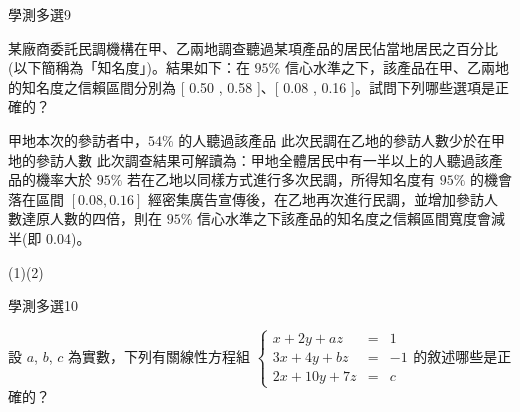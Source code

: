 \begin{QUESTIONS}
\begin{QUESTION}
\begin{ExamInfo}{98}{學測}{多選}{9}
        \end{ExamInfo}
        \begin{ExamAnsRateInfo}{7}{6}{8}{7}
        \end{ExamAnsRateInfo}
        \begin{QBODY}
            某廠商委託民調機構在甲、乙兩地調查聽過某項產品的居民佔當地居民之百分比(以下簡稱為「知名度」)。結果如下：在 $95\%$ 信心水準之下，該產品在甲、乙兩地的知名度之信賴區間分別為 [ 0.50 , 0.58 ]、[ 0.08 , 0.16 ]。試問下列哪些選項是正確的？ 
		\begin{QOPS} 
			\QOP 甲地本次的參訪者中，$54\%$ 的人聽過該產品 
			\QOP 此次民調在乙地的參訪人數少於在甲地的參訪人數 
			\QOP 此次調查結果可解讀為：甲地全體居民中有一半以上的人聽過該產品的機率大於 $95\%$    
			\QOP 若在乙地以同樣方式進行多次民調，所得知名度有 $95\%$ 的機會落在區間 $[0.08 , 0.16 ]$    \QOP 經密集廣告宣傳後，在乙地再次進行民調，並增加參訪人數達原人數的四倍，則在 $95\%$ 
		信心水準之下該產品的知名度之信賴區間寬度會減半(即 0.04)。
		\end{QOPS}
        \end{QBODY}
        \begin{QFROMS}
        \end{QFROMS}
        \begin{QTAGS}\end{QTAGS}
        \begin{QANS}
            (1)(2)
        \end{QANS}
        \begin{QSOLLIST}
        \end{QSOLLIST}
        \begin{QEMPTYSPACE}
        \end{QEMPTYSPACE}
    \end{QUESTION}
    \begin{QUESTION}
        \begin{ExamInfo}{98}{學測}{多選}{10}
        \end{ExamInfo}
        \begin{ExamAnsRateInfo}{8}{11}{6}{7}
        \end{ExamAnsRateInfo}
        \begin{QBODY}
            設 $a$, $b$, $c$ 為實數，下列有關線性方程組 $\left\{ \begin{array}{rlc}x+2y+az &=&1 \\ 3x+4y+bz &=& -1 \\ 2x+10y+7z &=& c  \end{array}\right.$的敘述哪些是正確的？

\end{QBODY}
\end{QUESTION}
\end{QUESTIONS}

